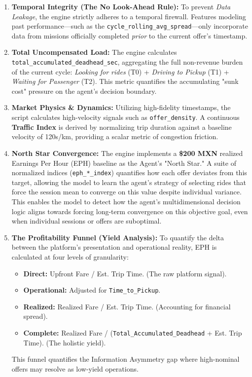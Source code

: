 \begin{enumerate}
    \item \textbf{Temporal Integrity (The No Look-Ahead Rule):} To prevent \textit{Data Leakage}, the engine strictly adheres to a temporal firewall. Features modeling past performance—such as the \texttt{cycle\_rolling\_avg\_spread}—only incorporate data from missions officially completed \textit{prior} to the current offer's timestamp.
    
   \item \textbf{Total Uncompensated Load:} The engine calculates \texttt{total\_accumulated\_deadhead\_sec}, aggregating the full non-revenue burden of the current cycle: \textit{Looking for rides} (T0) + \textit{Driving to Pickup} (T1) + \textit{Waiting for Passenger} (T2). This metric quantifies the accumulating "sunk cost" pressure on the agent's decision boundary.
    
    \item \textbf{Market Physics \& Dynamics:} Utilizing high-fidelity timestamps, the script calculates high-velocity signals such as \texttt{offer\_density}. A continuous \textbf{Traffic Index} is derived by normalizing trip duration against a baseline velocity of 120s/km, providing a scalar metric of congestion friction.

    \item \textbf{North Star Convergence:} The engine implements a \textbf{\$200 MXN} realized Earnings Per Hour (EPH) baseline as the Agent's "North Star." A suite of normalized indices (\texttt{eph\_*\_index}) quantifies how each offer deviates from this target, allowing the model to learn the agent's strategy of selecting rides that force the session mean to converge on this value despite individual variance. This enables the model to detect how the agent's multidimensional decision logic aligns towards forcing long-term convergence on this objective goal, even when individual sessions or offers are suboptimal.

    \item \textbf{The Profitability Funnel (Yield Analysis):} To quantify the delta between the platform's presentation and operational reality, EPH is calculated at four levels of granularity:
    \begin{itemize}
        \item \textbf{Direct:} Upfront Fare / Est. Trip Time. (The raw platform signal).
        \item \textbf{Operational:} Adjusted for \texttt{Time\_to\_Pickup}. 
        \item \textbf{Realized:} Realized Fare / Est. Trip Time. (Accounting for financial spread).
        \item \textbf{Complete:} Realized Fare / (\texttt{Total\_Accumulated\_Deadhead} + Est. Trip Time). (The holistic yield).
    \end{itemize}
    This funnel quantifies the Information Asymmetry gap where high-nominal offers may resolve as low-yield operations.
\end{enumerate}
